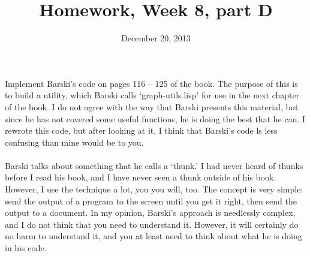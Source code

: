 \documentclass{article}
\title{Homework, Week 8, part D}
\date{December 20, 2013}
\begin{document}
\maketitle{}

\paragraph{}Implement Barski's code on pages 116 -- 125 of the book. The purpose of this is to build a utility, which Barski calls `graph-utils.lisp' for use in the next chapter of the book. I do not agree with the way that Barski presents this material, but since he has not covered some useful functions, he is doing the best that he can. I rewrote this code, but after looking at it, I think that Barski's code ls less confusing than mine would be to you.

\paragraph{}Barski talks about something that he calls a `thunk.' I had never heard of thunks before I read his book, and I have never seen a thunk outside of his book. However, I use the technique a lot, you you will, too. The concept is very simple: send the output of a program to the screen until you get it right, then send the output to a document. In my opinion, Barski's approach is needlessly complex, and I do not think that you need to understand it. However, it will certainly do no harm to understand it, and you at least need to think about what he is doing in his code.
\end{document}
